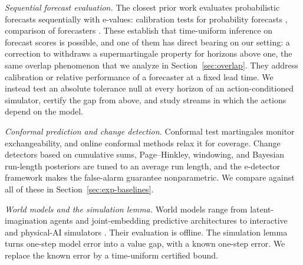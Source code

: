 \emph{Sequential forecast evaluation.} The closest prior work evaluates probabilistic forecasts
sequentially with e-values: calibration tests for probability forecasts \citep{arnold2023sequentially},
comparison of forecasters \citep{henzi2022valid,choe2024comparing}. These establish that
time-uniform inference on forecast scores is possible, and one of them has direct bearing on our
setting: a correction to \citet{henzi2022valid} withdraws a supermartingale property for horizons
above one, the same overlap phenomenon that we analyze in Section~\ref{sec:overlap}. They address
calibration or relative performance of a forecaster at a fixed lead time. We instead test an
absolute tolerance null at every horizon of an action-conditioned simulator, certify the gap from
above, and study streams in which the actions depend on the model.

\emph{Conformal prediction and change detection.} Conformal test martingales
\citep{vovk2003testing} monitor exchangeability, and online conformal methods
\citep{gibbs2021adaptive,gibbs2024conformal,tibshirani2019covariate} relax it for coverage.
Change detectors based on cumulative sums, Page--Hinkley, windowing, and Bayesian run-length
posteriors \citep{page1954cusum,bifet2007adwin,raab2020kswin,adams2007bocpd} are tuned to an average
run length, and the e-detector framework \citep{shin2024edetectors} makes the false-alarm guarantee
nonparametric. We compare against all of these in Section~\ref{sec:exp-baselines}.

\emph{World models and the simulation lemma.} World models range from latent-imagination agents
\citep{ha2018worldmodels,hafner2023dreamerv3} and joint-embedding predictive architectures
\citep{assran2023ijepa,bardes2024vjepa,assran2025vjepa2} to interactive and physical-AI simulators
\citep{bruce2024genie,nvidia2025cosmos}. Their evaluation is offline. The simulation lemma
\citep{kearns2002near,janner2019mbpo,lobel2024tightness} turns one-step model error into a value
gap, with a known one-step error. We replace the known error by a time-uniform certified bound.

